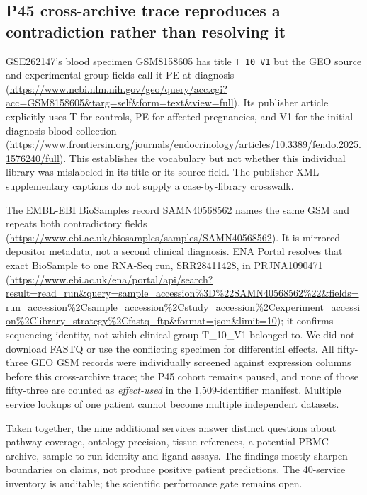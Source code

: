 \documentclass[11pt,a4paper]{article}
\begin{document}
\subsection{P45 cross-archive trace reproduces a contradiction rather than resolving it}
GSE262147's blood specimen GSM8158605 has title \texttt{T\_10\_V1} but the GEO source and experimental-group fields call it PE at diagnosis (\url{https://www.ncbi.nlm.nih.gov/geo/query/acc.cgi?acc=GSM8158605&targ=self&form=text&view=full}). Its publisher article explicitly uses T for controls, PE for affected pregnancies, and V1 for the initial diagnosis blood collection (\url{https://www.frontiersin.org/journals/endocrinology/articles/10.3389/fendo.2025.1576240/full}). This establishes the vocabulary but not whether this individual library was mislabeled in its title or its source field. The publisher XML supplementary captions do not supply a case-by-library crosswalk.

The EMBL-EBI BioSamples record SAMN40568562 names the same GSM and repeats both contradictory fields (\url{https://www.ebi.ac.uk/biosamples/samples/SAMN40568562}). It is mirrored depositor metadata, not a second clinical diagnosis. ENA Portal resolves that exact BioSample to one RNA-Seq run, SRR28411428, in PRJNA1090471 (\url{https://www.ebi.ac.uk/ena/portal/api/search?result=read_run&query=sample_accession%3D%22SAMN40568562%22&fields=run_accession%2Csample_accession%2Cstudy_accession%2Cexperiment_accession%2Clibrary_strategy%2Cfastq_ftp&format=json&limit=10}); it confirms sequencing identity, not which clinical group T\_10\_V1 belonged to. We did not download FASTQ or use the conflicting specimen for differential effects. All fifty-three GEO GSM records were individually screened against expression columns before this cross-archive trace; the P45 cohort remains paused, and none of those fifty-three are counted as \emph{effect-used} in the 1,509-identifier manifest. Multiple service lookups of one patient cannot become multiple independent datasets.

Taken together, the nine additional services answer distinct questions about pathway coverage, ontology precision, tissue references, a potential PBMC archive, sample-to-run identity and ligand assays. The findings mostly sharpen boundaries on claims, not produce positive patient predictions. The 40-service inventory is auditable; the scientific performance gate remains open.
\end{document}
